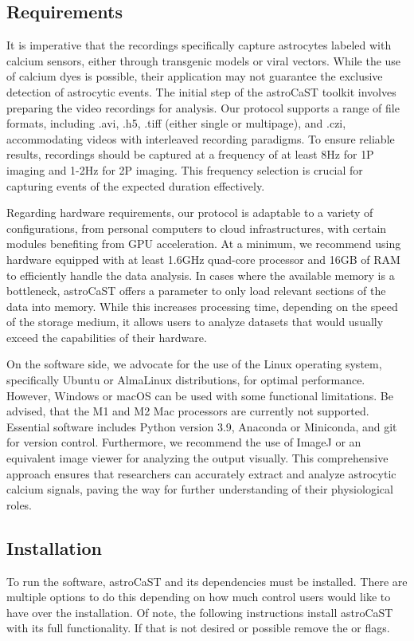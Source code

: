\subsection{Requirements}
It is imperative that the recordings specifically capture astrocytes labeled with calcium sensors, either through transgenic models or viral vectors. While the use of calcium dyes is possible, their application may not guarantee the exclusive detection of astrocytic events. The initial step of the astroCaST toolkit involves preparing the video recordings for analysis. Our protocol supports a range of file formats, including .avi, .h5, .tiff (either single or multipage), and .czi, accommodating videos with interleaved recording paradigms. To ensure reliable results, recordings should be captured at a frequency of at least 8Hz for \ac{1P} imaging and 1-2Hz for \ac{2P} imaging. This frequency selection is crucial for capturing events of the expected duration effectively.

Regarding hardware requirements, our protocol is adaptable to a variety of configurations, from personal computers to cloud infrastructures, with certain modules benefiting from \ac{GPU} acceleration. At a minimum, we recommend using hardware equipped with at least 1.6GHz quad-core processor and 16GB of RAM to efficiently handle the data analysis. In cases where the available memory is a bottleneck, astroCaST offers a  parameter to only load relevant sections of the data into memory. While this increases processing time, depending on the speed of the storage medium, it allows users to analyze datasets that would usually exceed the capabilities of their hardware.

On the software side, we advocate for the use of the Linux operating system, specifically Ubuntu or AlmaLinux distributions, for optimal performance. However, Windows or macOS can be used with some functional limitations. Be advised, that the M1 and M2 Mac processors are currently not supported. Essential software includes Python version 3.9, Anaconda or Miniconda, and git for version control. Furthermore, we recommend the use of ImageJ or an equivalent image viewer for analyzing the output visually. This comprehensive approach ensures that researchers can accurately extract and analyze astrocytic calcium signals, paving the way for further understanding of their physiological roles.

\subsection{Installation}
To run the software, astroCaST and its dependencies must be installed. There are multiple options to do this depending on how much control users would like to have over the installation. Of note, the following instructions install astroCaST with its full functionality. If that is not desired or possible remove the  or \inlineBash{[all]} flags.

